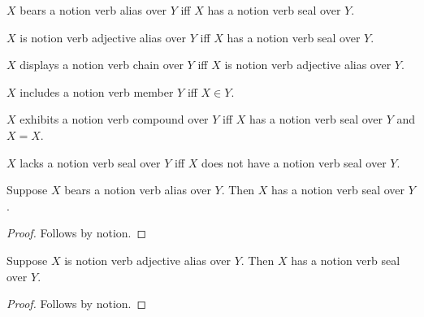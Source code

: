 

\begin{abbreviation}\label{notion_verb_alias}
    $X$ bears a notion verb alias over $Y$ iff
        $X$ has a notion verb seal over $Y$.
\end{abbreviation}

\begin{abbreviation}\label{notion_verb_adjective_alias}
    $X$ is notion verb adjective alias over $Y$ iff
        $X$ has a notion verb seal over $Y$.
\end{abbreviation}

\begin{abbreviation}\label{notion_verb_chain}
    $X$ displays a notion verb chain over $Y$ iff
        $X$ is notion verb adjective alias over $Y$.
\end{abbreviation}

\begin{abbreviation}\label{notion_verb_member_alias}
    $X$ includes a notion verb member $Y$ iff $X\in Y$.
\end{abbreviation}

\begin{abbreviation}\label{notion_verb_compound_alias}
    $X$ exhibits a notion verb compound over $Y$ iff
        $X$ has a notion verb seal over $Y$ and $X=X$.
\end{abbreviation}

\begin{abbreviation}\label{notion_verb_negative_alias}
    $X$ lacks a notion verb seal over $Y$ iff
        $X$ does not have a notion verb seal over $Y$.
\end{abbreviation}

\begin{proposition}\label{notion_verb_alias_use}
    Suppose $X$ bears a notion verb alias over $Y$.
    Then $X$ has a notion verb seal over $Y$.
\end{proposition}
\begin{proof}
    Follows by notion.
\end{proof}

\begin{proposition}\label{notion_verb_adjective_alias_use}
    Suppose $X$ is notion verb adjective alias over $Y$.
    Then $X$ has a notion verb seal over $Y$.
\end{proposition}
\begin{proof}
    Follows by notion.
\end{proof}

